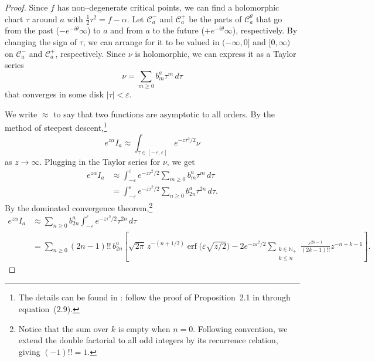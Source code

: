 \documentclass{article}
\theoremstyle{definition}
\theoremstyle{plain}
\begin{document}
\begin{proof}
Since $f$ has non--degenerate critical points, we can find a holomorphic chart $\tau$ around $a$ with $\tfrac{1}{2} \tau^2 = f - \alpha$. Let $\mathcal{C}^-_a$ and $\mathcal{C}^+_a$ be the parts of $\mathcal{C}_a^\theta$ that go from the past ($-e^{-i\theta}\infty$) to $a$ and from $a$ to the future ($+e^{-i\theta}\infty$), respectively. By changing the sign of $\tau$, we can arrange for it to be valued in $(-\infty, 0]$ and $[0,\infty)$ on $\mathcal{C}^-_a$ and $\mathcal{C}^+_a$, respectively. Since $\nu$ is holomorphic, we can express it as a Taylor series
\[ \nu = \sum_{m \ge 0} b_m^a \tau^m\,d\tau \]
that converges in some disk $|\tau| < \varepsilon$.

We write $\approx$ to say that two functions are asymptotic to all orders. By the method of steepest descent,\footnote{The details can be found in \cite{miller2006applied}: follow the proof of Proposition~2.1 in through equation~(2.9).}
\[ e^{z \alpha} I_a \approx \int_{\tau \in [-\varepsilon, \varepsilon]} e^{-z\tau^2/2} \nu \]
as $z \to \infty$. Plugging in the Taylor series for $\nu$, we get
\begin{align*}
e^{z \alpha} I_a & \approx \int_{-\varepsilon}^\varepsilon e^{-z\tau^2/2} \sum_{m \ge 0} b_m^a \tau^m\,d\tau \\
& = \int_{-\varepsilon}^\varepsilon e^{-z\tau^2/2} \sum_{n \ge 0} b_{2n}^a \tau^{2n}\,d\tau.
\end{align*}
By the dominated convergence theorem,\footnote{Notice that the sum over $k$ is empty when $n = 0$. Following convention, we extend the double factorial to all odd integers by its recurrence relation, giving $(-1)!! = 1$.}
\begin{align*}
e^{z \alpha} I_a & \approx \sum_{n \ge 0} b_{2n}^a \int_{-\varepsilon}^\varepsilon e^{-z\tau^2/2} \tau^{2n}\,d\tau \\
& = \sum_{n \ge 0} (2n-1)!!\,b_{2n}^a \left[ \sqrt{2\pi}\,z^{-(n+1/2)} \operatorname{erf}\big(\varepsilon \sqrt{z/2}\big) - 2e^{-z\varepsilon^2/2} \sum_{\substack{k \in \mathbb{N}_+ \\ k \le n}} \frac{\varepsilon^{2k-1}}{(2k-1)!!} z^{-n+k-1} \right].
\end{align*}


\end{proof}
\end{document}
